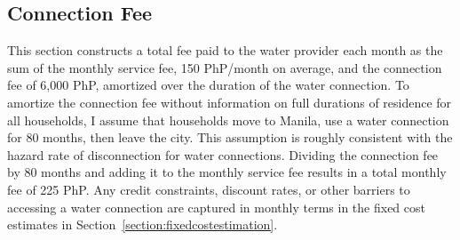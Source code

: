 \documentclass[12pt]{article}
\renewcommand{\thetable}{\Roman{table}}
\renewcommand{\thefigure}{\Roman{figure}}
\renewcommand{\thesection}{\Roman{section}}
\renewcommand{\thesubsection}{\thesection.\Alph{subsection}}
\begin{document}
\begin{appendices}



\renewcommand{\thesection}{A.\Roman{section}} 
\renewcommand{\thesubsection}{\thesection.\roman{subsection}}










\section{Connection Fee}\label{appendix:connectionfeeamortization}

This section constructs a total fee paid to the water provider each month as the sum of the monthly service fee, 150 PhP/month on average, and the connection fee of 6,000 PhP, amortized over the duration of the water connection.  To amortize the connection fee without information on full durations of residence for all households, I assume that households move to Manila, use a water connection for 80 months, then leave the city.  This assumption is roughly consistent with the hazard rate of disconnection for water connections.  Dividing the connection fee by 80 months and adding it to the monthly service fee results in a total monthly fee of 225 PhP.  Any credit constraints, discount rates, or other barriers to accessing a water connection are captured in monthly terms in the fixed cost estimates in Section~\ref{section:fixedcostestimation}.



\end{appendices}
\end{document}
